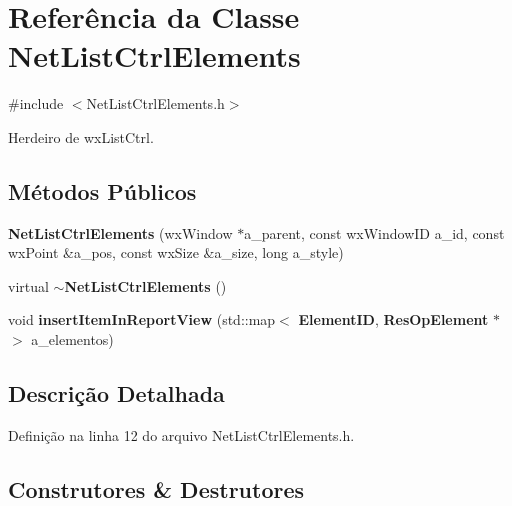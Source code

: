 \section{Referência da Classe Net\+List\+Ctrl\+Elements}
\label{class_net_list_ctrl_elements}


{\ttfamily \#include $<$Net\+List\+Ctrl\+Elements.\+h$>$}



Herdeiro de wx\+List\+Ctrl.

\subsection*{Métodos Públicos}
\begin{DoxyCompactItemize}
\item 
{\bf Net\+List\+Ctrl\+Elements} (wx\+Window $\ast$a\+\_\+parent, const wx\+Window\+ID a\+\_\+id, const wx\+Point \&a\+\_\+pos, const wx\+Size \&a\+\_\+size, long a\+\_\+style)
\item 
virtual {\bf $\sim$\+Net\+List\+Ctrl\+Elements} ()
\item 
void {\bf insert\+Item\+In\+Report\+View} (std\+::map$<$ {\bf Element\+ID}, {\bf Res\+Op\+Element} $\ast$ $>$ a\+\_\+elementos)
\end{DoxyCompactItemize}


\subsection{Descrição Detalhada}


Definição na linha 12 do arquivo Net\+List\+Ctrl\+Elements.\+h.



\subsection{Construtores \& Destrutores}
